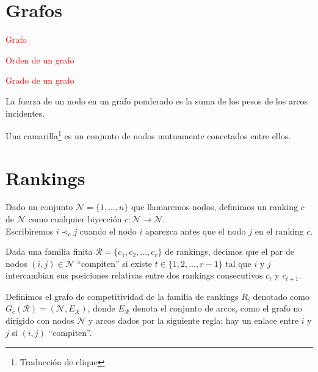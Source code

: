 \section{Grafos}

\begin{defi}
\textcolor{red}{Grafo}
\end{defi}

\begin{defi}
\textcolor{red}{Orden de un grafo}
\end{defi}

\begin{defi}
\textcolor{red}{Grado de un grafo}
\end{defi}

\begin{defi}
La fuerza de un nodo en un grafo ponderado es la suma de los pesos de los arcos incidentes.
\end{defi}

\begin{defi}
Una camarilla\footnote{Traducción de clique} es un conjunto de nodos mutuamente conectados entre ellos.
\end{defi}

\section{Rankings}

\begin{defi}
Dado un conjunto $\mathcal{N} = \{1,\dots,n\}$ que llamaremos nodos, definimos un ranking $c$ de $\mathcal{N}$ como cualquier biyección $c: \mathcal{N} \to \mathcal{N}$.\\
Escribiremos $i \prec_c j$ cuando el nodo $i$ aparezca antes que el nodo $j$ en el ranking $c$. 
\end{defi}

\begin{defi}
Dada una familia finita $\mathcal{R} = \{c_1,c_2,\dots, c_r\}$ de rankings, decimos que el par de nodos $(i,j) \in \mathcal{N}$ ``compiten'' si existe $t \in \{1,2,\dots, r-1\}$ tal que $i$ y $j$ intercambian sus posiciones relativas entre dos rankings consecutivos $c_t$ y $c_{t+1}$.
\end{defi}

\begin{defi}
Definimos el grafo de competitividad de la familia de rankings $R$, denotado como $G_c(\mathcal{R}) = (\mathcal{N}, E_\mathcal{R})$, donde $E_\mathcal{R}$ denota el conjunto de arcos, como el grafo no dirigido con nodos $\mathcal{N}$ y arcos dados por la siguiente regla: hay un enlace entre $i$ y $j$ si $(i,j)$ ``compiten''.
\end{defi}

